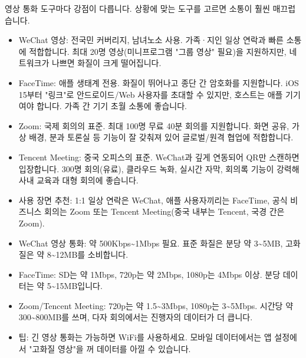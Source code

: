 
영상 통화 도구마다 강점이 다릅니다. 상황에 맞는 도구를 고르면 소통이 훨씬 매끄럽습니다.

\begin{itemize}
  \item WeChat 영상: 전국민 커버리지, 남녀노소 사용. 가족·지인 일상 연락과 빠른 소통에 적합합니다. 최대 20명 영상(미니프로그램 "그룹 영상" 필요)을 지원하지만, 네트워크가 나쁘면 화질이 크게 떨어집니다.
  \item FaceTime: 애플 생태계 전용. 화질이 뛰어나고 종단 간 암호화를 지원합니다. iOS 15부터 "링크"로 안드로이드/Web 사용자를 초대할 수 있지만, 호스트는 애플 기기여야 합니다. 가족 간 기기 초월 소통에 좋습니다.
  \item Zoom: 국제 회의의 표준. 최대 100명 무료 40분 회의를 지원합니다. 화면 공유, 가상 배경, 분과 토론실 등 기능이 잘 갖춰져 있어 글로벌/원격 협업에 적합합니다.
  \item Tencent Meeting: 중국 오피스의 표준. WeChat과 깊게 연동되어 QR만 스캔하면 입장합니다. 300명 회의(유료), 클라우드 녹화, 실시간 자막, 회의록 기능이 강력해 사내 교육과 대형 회의에 좋습니다.
  \item 사용 장면 추천: 1:1 일상 연락은 WeChat, 애플 사용자끼리는 FaceTime, 공식 비즈니스 회의는 Zoom 또는 Tencent Meeting(중국 내부는 Tencent, 국경 간은 Zoom).
\end{itemize}


\begin{itemize}
  \item WeChat 영상 통화: 약 500Kbps\textasciitilde{}1Mbps 필요. 표준 화질은 분당 약 3\textasciitilde{}5MB, 고화질은 약 8\textasciitilde{}12MB를 소비합니다.
  \item FaceTime: SD는 약 1Mbps, 720p는 약 2Mbps, 1080p는 4Mbps 이상. 분당 데이터는 약 5\textasciitilde{}15MB입니다.
  \item Zoom/Tencent Meeting: 720p는 약 1.5\textasciitilde{}3Mbps, 1080p는 3\textasciitilde{}5Mbps. 시간당 약 300\textasciitilde{}800MB를 쓰며, 다자 회의에서는 진행자의 데이터가 더 큽니다.
  \item 팁: 긴 영상 통화는 가능하면 WiFi를 사용하세요. 모바일 데이터에서는 앱 설정에서 "고화질 영상"을 꺼 데이터를 아낄 수 있습니다.
\end{itemize}


